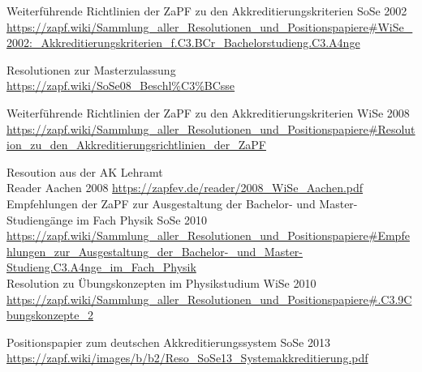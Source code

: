 \documentclass[a4paper]{scrartcl}
\begin{document}
\renewcommand\refname{\,}
\begin{thebibliography}{999}


 Weiterführende Richtlinien der ZaPF zu den Akkreditierungskriterien SoSe 2002\\
\url{https://zapf.wiki/Sammlung_aller_Resolutionen_und_Positionspapiere#WiSe_2002:_Akkreditierungskriterien_f.C3.BCr_Bachelorstudieng.C3.A4nge}

Resolutionen zur Masterzulassung\\
\url{https://zapf.wiki/SoSe08_Beschl\%C3\%BCsse}

 Weiterführende Richtlinien der ZaPF zu den Akkreditierungskriterien WiSe 2008\\
\url{https://zapf.wiki/Sammlung_aller_Resolutionen_und_Positionspapiere#Resolution_zu_den_Akkreditierungsrichtlinien_der_ZaPF}

 Resoution aus der AK Lehramt\\
Reader Aachen 2008 \url{https://zapfev.de/reader/2008_WiSe_Aachen.pdf}\\

 Empfehlungen der ZaPF zur Ausgestaltung der Bachelor- und Master-Studiengänge im Fach Physik SoSe 2010\\
\url{https://zapf.wiki/Sammlung_aller_Resolutionen_und_Positionspapiere#Empfehlungen_zur_Ausgestaltung_der_Bachelor-_und_Master-Studieng.C3.A4nge_im_Fach_Physik}\\

 Resolution zu Übungskonzepten im Physikstudium WiSe 2010\\
\url{https://zapf.wiki/Sammlung_aller_Resolutionen_und_Positionspapiere#.C3.9Cbungskonzepte_2}

 Positionspapier zum deutschen Akkreditierungssystem SoSe 2013\\
\url{https://zapf.wiki/images/b/b2/Reso_SoSe13_Systemakkreditierung.pdf}\\


\end{thebibliography}
\end{document}
